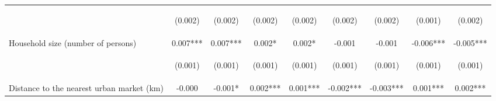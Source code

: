 \begin{center}
\begin{tabular}{lcccccccc}
\vspace{4pt} & \begin{footnotesize}(0.002)\end{footnotesize} & \begin{footnotesize}(0.002)\end{footnotesize} & \begin{footnotesize}(0.002)\end{footnotesize} & \begin{footnotesize}(0.002)\end{footnotesize} & \begin{footnotesize}(0.002)\end{footnotesize} & \begin{footnotesize}(0.002)\end{footnotesize} & \begin{footnotesize}(0.001)\end{footnotesize} & \begin{footnotesize}(0.002)\end{footnotesize} \\
Household size (number of persons) & 0.007*** & 0.007*** & 0.002* & 0.002* & -0.001 & -0.001 & -0.006*** & -0.005*** \\
\vspace{4pt} & \begin{footnotesize}(0.001)\end{footnotesize} & \begin{footnotesize}(0.001)\end{footnotesize} & \begin{footnotesize}(0.001)\end{footnotesize} & \begin{footnotesize}(0.001)\end{footnotesize} & \begin{footnotesize}(0.001)\end{footnotesize} & \begin{footnotesize}(0.001)\end{footnotesize} & \begin{footnotesize}(0.001)\end{footnotesize} & \begin{footnotesize}(0.001)\end{footnotesize} \\
Distance to the nearest urban market (km) & -0.000 & -0.001* & 0.002*** & 0.001*** & -0.002*** & -0.003*** & 0.001*** & 0.002*** \\

\end{tabular}
\end{center}
